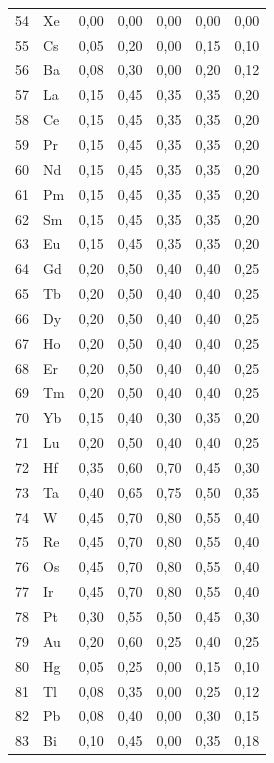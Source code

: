 \documentclass[12pt,a4paper]{article}
\begin{document}
\begin{longtable}{p{2.2cm}p{1.2cm}p{2.2cm}p{2.2cm}p{2.2cm}p{2.2cm}p{2.2cm}}
	54 & Xe  & 0,00 & 0,00 & 0,00 & 0,00 & 0,00 \\
	55 & Cs  & 0,05 & 0,20 & 0,00 & 0,15 & 0,10 \\
	56 & Ba  & 0,08 & 0,30 & 0,00 & 0,20 & 0,12 \\
	57 & La  & 0,15 & 0,45 & 0,35 & 0,35 & 0,20 \\
	58 & Ce  & 0,15 & 0,45 & 0,35 & 0,35 & 0,20 \\
	59 & Pr  & 0,15 & 0,45 & 0,35 & 0,35 & 0,20 \\
	60 & Nd  & 0,15 & 0,45 & 0,35 & 0,35 & 0,20 \\
	61 & Pm  & 0,15 & 0,45 & 0,35 & 0,35 & 0,20 \\
	62 & Sm  & 0,15 & 0,45 & 0,35 & 0,35 & 0,20 \\
	63 & Eu  & 0,15 & 0,45 & 0,35 & 0,35 & 0,20 \\
	64 & Gd  & 0,20 & 0,50 & 0,40 & 0,40 & 0,25 \\
	65 & Tb  & 0,20 & 0,50 & 0,40 & 0,40 & 0,25 \\
	66 & Dy  & 0,20 & 0,50 & 0,40 & 0,40 & 0,25 \\
	67 & Ho  & 0,20 & 0,50 & 0,40 & 0,40 & 0,25 \\
	68 & Er  & 0,20 & 0,50 & 0,40 & 0,40 & 0,25 \\
	69 & Tm  & 0,20 & 0,50 & 0,40 & 0,40 & 0,25 \\
	70 & Yb  & 0,15 & 0,40 & 0,30 & 0,35 & 0,20 \\
	71 & Lu  & 0,20 & 0,50 & 0,40 & 0,40 & 0,25 \\
	72 & Hf  & 0,35 & 0,60 & 0,70 & 0,45 & 0,30 \\
	73 & Ta  & 0,40 & 0,65 & 0,75 & 0,50 & 0,35 \\
	74 & W   & 0,45 & 0,70 & 0,80 & 0,55 & 0,40 \\
	75 & Re  & 0,45 & 0,70 & 0,80 & 0,55 & 0,40 \\
	76 & Os  & 0,45 & 0,70 & 0,80 & 0,55 & 0,40 \\
	77 & Ir  & 0,45 & 0,70 & 0,80 & 0,55 & 0,40 \\
	78 & Pt  & 0,30 & 0,55 & 0,50 & 0,45 & 0,30 \\
	79 & Au  & 0,20 & 0,60 & 0,25 & 0,40 & 0,25 \\
	80 & Hg  & 0,05 & 0,25 & 0,00 & 0,15 & 0,10 \\
	81 & Tl  & 0,08 & 0,35 & 0,00 & 0,25 & 0,12 \\
	82 & Pb  & 0,08 & 0,40 & 0,00 & 0,30 & 0,15 \\
	83 & Bi  & 0,10 & 0,45 & 0,00 & 0,35 & 0,18 \\

\end{longtable}
\end{document}
